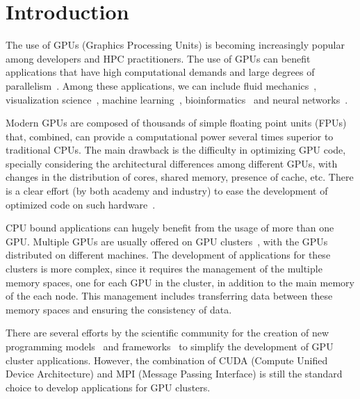 \documentclass[journal]{IEEEtran}
\begin{document}
\section{Introduction}


The use of GPUs (Graphics Processing Units) is becoming increasingly popular
among developers and HPC practitioners. The use of GPUs can benefit applications that have high computational demands
and large degrees of parallelism~\cite{gpu2}. Among these
applications, we can include fluid mechanics~\cite{fluid2}, visualization
science~\cite{visualization2}, machine learning~\cite{learning2},
bioinformatics~\cite{bioinformatica2} and neural networks~\cite{neural}.

Modern GPUs are composed of thousands of simple floating point units (FPUs) that,
combined, can provide a computational power several times superior to traditional
CPUs. The main drawback is the difficulty in optimizing GPU code, specially
considering the architectural differences among different GPUs, with changes in
the distribution of cores, shared memory, presence of cache, etc. There is a clear effort (by both academy and industry) to ease the development of optimized code on such hardware~\cite{cuNN, cuMath}.


CPU bound applications can hugely benefit from the usage of
more than one GPU. Multiple GPUs are usually offered on GPU
clusters~\cite{raphael, cluster}, with the GPUs distributed on different machines.
The development of applications for these
clusters is more complex, since it requires the management of the multiple
memory spaces, one for each GPU in the cluster, in addition to the main memory
of the each node. This management includes transferring data between these
memory spaces and ensuring the consistency of data. 

There are several efforts by the scientific community for the creation of new
programming models~\cite{appCientificas, wave} and frameworks~\cite{snucl, Flat,
  starpu} to simplify the development of GPU cluster
applications. However, the combination of CUDA (Compute Unified Device
Architecture) and MPI (Message Passing Interface) is still the standard choice
to develop applications for GPU clusters.
\end{document}
